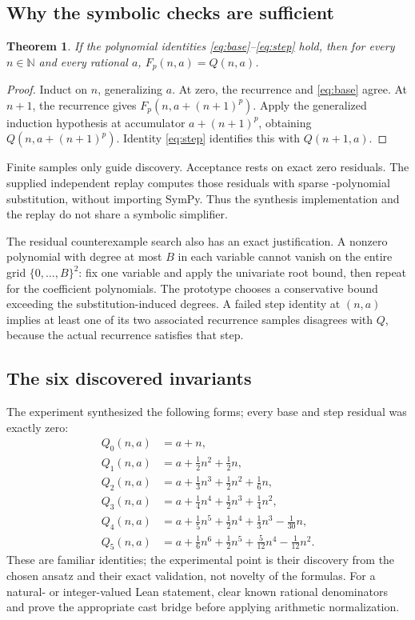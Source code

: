 \documentclass[11pt,letterpaper]{article}
\newcommand{\code}[1]{\texttt{\detokenize{#1}}}
\newcommand{\N}{\mathbb{N}}
\newtheorem{theorem}[proposition]{Theorem}
\theoremstyle{definition}\newtheorem{definition}[proposition]{Definition}
\begin{document}
\subsection{Why the symbolic checks are sufficient}
\begin{theorem}
If the polynomial identities \eqref{eq:base}--\eqref{eq:step} hold, then for every $n\in\N$ and every rational $a$, $F_p(n,a)=Q(n,a)$.
\end{theorem}
\begin{proof}
Induct on $n$, generalizing $a$. At zero, the recurrence and \eqref{eq:base} agree. At $n+1$, the recurrence gives $F_p(n,a+(n+1)^p)$. Apply the generalized induction hypothesis at accumulator $a+(n+1)^p$, obtaining $Q(n,a+(n+1)^p)$. Identity \eqref{eq:step} identifies this with $Q(n+1,a)$.
\end{proof}

Finite samples only guide discovery. Acceptance rests on exact zero residuals. The supplied independent replay computes those residuals with sparse \code{Fraction}-polynomial substitution, without importing SymPy. Thus the synthesis implementation and the replay do not share a symbolic simplifier.

The residual counterexample search also has an exact justification. A nonzero polynomial with degree at most $B$ in each variable cannot vanish on the entire grid $\{0,\ldots,B\}^2$: fix one variable and apply the univariate root bound, then repeat for the coefficient polynomials. The prototype chooses a conservative bound exceeding the substitution-induced degrees. A failed step identity at $(n,a)$ implies at least one of its two associated recurrence samples disagrees with $Q$, because the actual recurrence satisfies that step.

\subsection{The six discovered invariants}
The experiment synthesized the following forms; every base and step residual was exactly zero:
\begin{align*}
Q_0(n,a)&=a+n,\\
Q_1(n,a)&=a+\tfrac12n^2+\tfrac12n,\\
Q_2(n,a)&=a+\tfrac13n^3+\tfrac12n^2+\tfrac16n,\\
Q_3(n,a)&=a+\tfrac14n^4+\tfrac12n^3+\tfrac14n^2,\\
Q_4(n,a)&=a+\tfrac15n^5+\tfrac12n^4+\tfrac13n^3-\tfrac1{30}n,\\
Q_5(n,a)&=a+\tfrac16n^6+\tfrac12n^5+\tfrac5{12}n^4-\tfrac1{12}n^2.
\end{align*}
These are familiar identities; the experimental point is their discovery from the chosen ansatz and their exact validation, not novelty of the formulas. For a natural- or integer-valued Lean statement, clear known rational denominators and prove the appropriate cast bridge before applying arithmetic normalization.
\end{document}
